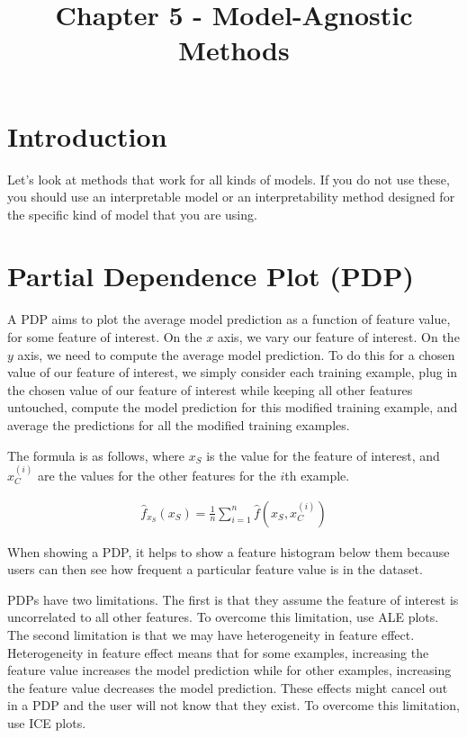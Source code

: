 \documentclass[a4paper]{article}
\title{Chapter 5 - Model-Agnostic Methods}
\date{}
\begin{document}
\maketitle

\section{Introduction}
Let's look at methods that work for all kinds of models. If you do not use
these, you should use an interpretable model or an interpretability method
designed for the specific kind of model that you are using.

\section{Partial Dependence Plot (PDP)}
A PDP aims to plot the average model prediction as a function of feature value,
for some feature of interest. On the $x$ axis, we vary our feature of interest.
On the $y$ axis, we need to compute the average model prediction. To do this for
a chosen value of our feature of interest, we simply consider each training example, plug in the chosen value of our feature of interest while keeping all
other features untouched, compute the model prediction for this modified training
example, and average the predictions for all the modified training examples.

The formula is as follows, where $x_S$ is the value for the feature of interest,
and $x_C^{(i)}$ are the values for the other features for the $i$th example.

\begin{align}
  \hat{f}_{x_S}(x_S) = \frac{1}{n} \sum_{i=1}^{n}{\hat{f}(x_S, x_C^{(i)})}
\end{align}

When showing a PDP, it helps to show a feature histogram below them because users
can then see how frequent a particular feature value is in the dataset.

PDPs have two limitations. The first is that they assume the feature of interest
is uncorrelated to all other features. To overcome this limitation, use ALE plots.
The second limitation is that we may have heterogeneity in feature effect.
Heterogeneity in feature effect means that for some examples, increasing the
feature value increases the
model prediction while for other examples, increasing the feature value decreases
the model prediction. These effects might cancel out in a PDP and the user will
not know that they exist. To overcome this limitation, use ICE plots.
\end{document}
